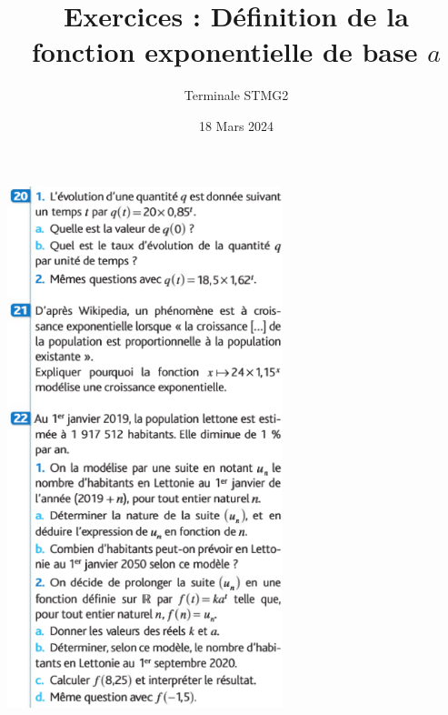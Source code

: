 \documentclass{article}
\title{Exercices : Définition de la fonction exponentielle de base $a$}
\author{Terminale STMG2}
\date{18 Mars 2024}
\begin{document}
\maketitle

\begin{center}
\includegraphics[width=0.6\textwidth]{Exercices_definition_exponentielle.png}
\end{center}
\end{document}
